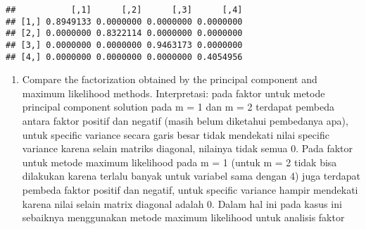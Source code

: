 \documentclass[
]{article}
\newenvironment{Shaded}{\begin{snugshade}}{\end{snugshade}}
\newcommand{\CommentTok}[1]{\textcolor[rgb]{0.56,0.35,0.01}{\textit{#1}}}
\providecommand{\tightlist}{%
  \setlength{\itemsep}{0pt}\setlength{\parskip}{0pt}}
\begin{document}
\begin{verbatim}
##           [,1]      [,2]      [,3]      [,4]
## [1,] 0.8949133 0.0000000 0.0000000 0.0000000
## [2,] 0.0000000 0.8322114 0.0000000 0.0000000
## [3,] 0.0000000 0.0000000 0.9463173 0.0000000
## [4,] 0.0000000 0.0000000 0.0000000 0.4054956
\end{verbatim}

\begin{Shaded}
\end{Shaded}

\begin{enumerate}
\def\labelenumi{(\alph{enumi})}
\setcounter{enumi}{2}
\tightlist
\item
  Compare the factorization obtained by the principal component and
  maximum likelihood methods. Interpretasi: pada faktor untuk metode
  principal component solution pada m = 1 dan m = 2 terdapat pembeda
  antara faktor positif dan negatif (masih belum diketahui pembedanya
  apa), untuk specific variance secara garis besar tidak mendekati nilai
  specific variance karena selain matriks diagonal, nilainya tidak semua
  0. Pada faktor untuk metode maximum likelihood pada m = 1 (untuk m = 2
  tidak bisa dilakukan karena terlalu banyak untuk variabel sama dengan
  4) juga terdapat pembeda faktor positif dan negatif, untuk specific
  variance hampir mendekati karena nilai selain matrix diagonal adalah
  0. Dalam hal ini pada kasus ini sebaiknya menggunakan metode maximum
  likelihood untuk analisis faktor
\end{enumerate}
\end{document}
